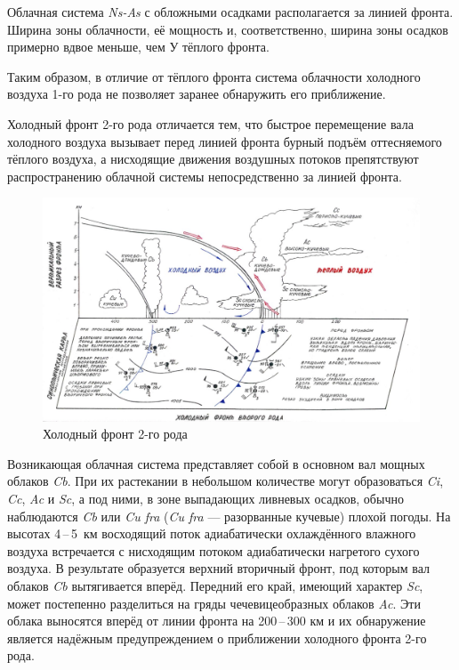 \documentclass[a4paper, 12pt, twoside, final, book, russian, fittopage, cyremdash, openright]{ncc}
\newcommand{\otdo}{\,--\,}
\begin{document}
Облачная система \textit{Ns-As} с обложными осадками располагается за
линией фронта. Ширина зоны облачности, её мощность и, соответственно,
ширина зоны осадков примерно вдвое меньше, чем У тёплого фронта.

Таким образом, в отличие от тёплого фронта система облачности
холодного воздуха 1-го рода не позволяет заранее обнаружить его
приближение.

Холодный фронт 2-го рода отличается тем, что быстрое перемещение вала
холодного воздуха вызывает перед линией фронта бурный подъём
оттесняемого тёплого воздуха, а нисходящие движения воздушных потоков
препятствуют распространению облачной системы непосредственно за
линией фронта.

\begin{figure}[htb]
   \centering
   \includegraphics[scale=0.7]{08_cold_front_2.pdf}
   \caption{Холодный фронт 2-го рода}
   \label{fig:08_cold_front_2}
\end{figure}

Возникающая облачная система представляет собой в основном вал мощных
облаков \textit{Cb}. При их растекании в небольшом количестве могут
образоваться \textit{Ci}, \textit{Cc}, \textit{Ac} и \textit{Sc}, а
под ними, в зоне выпадающих ливневых осадков, обычно наблюдаются
\textit{Cb} или \textit{Cu fra} (\textit{Cu fra} — разорванные
кучевые) плохой погоды.  На высотах 4\otdo5~км восходящий поток
адиабатически охлаждённого влажного воздуха встречается с нисходящим
потоком адиабатически нагретого сухого воздуха. В результате
образуется верхний вторичный фронт, под которым вал облаков
\textit{Cb} вытягивается вперёд. Передний его край, имеющий характер
\textit{Sc}, может постепенно разделиться на гряды чечевицеобразных
облаков \textit{Ac}. Эти облака выносятся вперёд от линии фронта на
200\otdo300 км и их обнаружение является надёжным предупреждением о
приближении холодного фронта 2-го рода.
\end{document}
